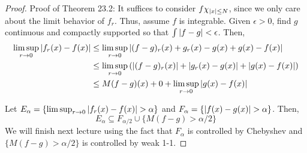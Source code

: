 \begin{proof}{Proof of Theorem 23.2:}
    It suffices to consider $f\chi_{\left\lvert {x} \right\rvert \leq N}$, since we only care about the limit behavior of $f_r$. Thus, assume $f$ is integrable. Given $\epsilon > 0$, find $g$ continuous and compactly supported so that $\int \left\lvert {f - g} \right\rvert < \epsilon$. Then,
    \begin{align*}
        \limsup_{r \to 0} \left\lvert {f_r(x) - f(x)} \right\rvert &\leq \limsup_{r \to 0} \left\lvert {(f - g)_r(x) + g_r(x) - g(x) + g(x) - f(x)} \right\rvert\\
        &\leq \limsup_{r \to 0} \left(\left\lvert {(f - g)_r(x)} \right\rvert + \left\lvert {g_r(x) - g(x)} \right\rvert + \left\lvert {g(x) - f(x)} \right\rvert\right)\\
        &\leq M(f - g)(x) + 0 + \limsup_{r \to 0} \left\lvert {g(x) - f(x)} \right\rvert
    \end{align*}

    Let $E_{\alpha} = \{\limsup_{r \to 0} \left\lvert {f_r(x) - f(x)} \right\rvert > \alpha\}$ and $F_{\alpha} = \{\left\lvert {f(x) - g(x)} \right\rvert > \alpha\}$. Then,
    \[ E_{\alpha} \subseteq F_{\alpha/2} \cup \{M(f - g) > \alpha/2\} \]
    We will finish next lecture using the fact that $F_{\alpha}$ is controlled by Chebyshev and $\{M(f - g) > \alpha/2\}$ is controlled by weak 1-1.
\end{proof}

